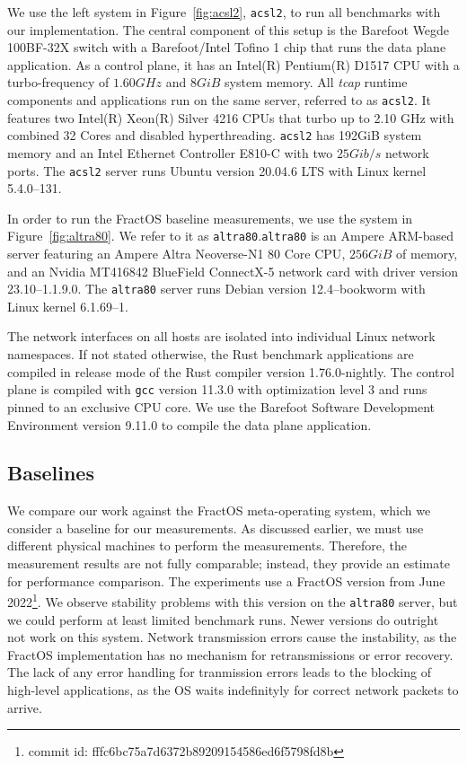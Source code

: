 We use the left system in Figure~\ref{fig:acsl2}, \texttt{acsl2}, to run all benchmarks with our implementation. The central component of this setup is the Barefoot Wegde 100BF-32X switch with a Barefoot/Intel Tofino 1 chip that runs the data plane application. As a control plane, it has an Intel(R) Pentium(R) D1517 \ac{CPU} with a turbo-frequency of $1.60 GHz$ and $8 GiB$ system memory. All \emph{tcap} runtime components and applications run on the same server, referred to as \texttt{acsl2}. It features two Intel(R) Xeon(R) Silver 4216 \acp{CPU} that turbo up to 2.10 GHz with combined 32 Cores and disabled hyperthreading. \texttt{acsl2} has 192GiB system memory and an Intel Ethernet Controller E810-C with two $25 Gib/s$ network ports. The \texttt{acsl2} server runs Ubuntu version 20.04.6 LTS with Linux kernel 5.4.0--131.\@

In order to run the FractOS baseline measurements, we use the system in Figure~\ref{fig:altra80}\@. We refer to it as \texttt{altra80}.\@ \texttt{altra80} is an Ampere ARM-based server featuring an Ampere Altra Neoverse-N1 80 Core \ac{CPU}, $256 GiB$ of memory, and an Nvidia MT416842 BlueField ConnectX-5 network card with driver version 23.10--1.1.9.0. The \texttt{altra80} server runs Debian version 12.4--bookworm with Linux kernel 6.1.69--1.\@

The network interfaces on all hosts are isolated into individual Linux network namespaces. If not stated otherwise, the Rust benchmark applications are compiled in release mode of the Rust compiler version 1.76.0-nightly. The control plane is compiled with \texttt{gcc} version 11.3.0 with optimization level 3 and runs pinned to an exclusive \ac{CPU} core. We use the Barefoot Software Development Environment version 9.11.0 to compile the data plane application.

\subsection{Baselines}\label{sec:eval-baseline}
We compare our work against the FractOS meta-operating system, which we consider a baseline for our measurements. As discussed earlier, we must use different physical machines to perform the measurements. Therefore, the measurement results are not fully comparable; instead,  they provide an estimate for performance comparison.
The experiments use a FractOS version from June 2022\footnote{commit id: fffc6bc75a7d6372b89209154586ed6f5798fd8b}. We observe stability problems with this version on the \texttt{altra80} server, but we could perform at least limited benchmark runs. Newer versions do outright not work on this system. Network transmission errors cause the instability, as the FractOS implementation has no mechanism for retransmissions or error recovery. The lack of any error handling for tranmission errors leads to the blocking of high-level applications, as the OS waits indefinityly for correct network packets to arrive.

